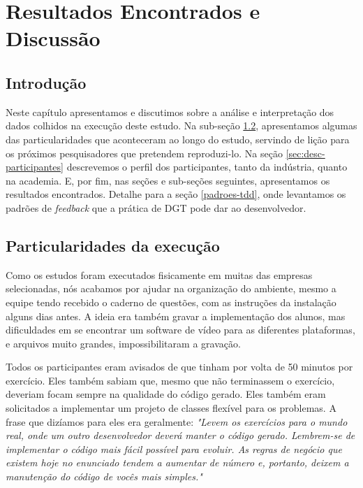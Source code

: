 \chapter{Resultados Encontrados e Discussão}
\label{cap:discussao}

\section{Introdução}

Neste capítulo apresentamos e discutimos sobre a análise e interpretação dos dados colhidos
na execução deste estudo. Na sub-seção \ref{subsec:particularidades-execucao}, apresentamos
algumas das particularidades que aconteceram ao longo do estudo, servindo de lição 
para os próximos pesquisadores que pretendem reproduzi-lo. Na seção \ref{sec:desc-participantes}
descrevemos o perfil dos participantes, tanto da indústria, quanto na academia. E, por fim, nas seções
e sub-seções seguintes, apresentamos os resultados encontrados. Detalhe para a seção 
\ref{padroes-tdd}, onde levantamos os padrões de \textit{feedback} que a prática de DGT
pode dar ao desenvolvedor.

\section{Particularidades da execução}
\label{subsec:particularidades-execucao}
Como os estudos foram executados fisicamente em muitas das empresas selecionadas,
nós acabamos por ajudar na organização do ambiente, mesmo a equipe tendo 
recebido o caderno de questões, com as instruções da instalação
alguns dias antes. A ideia era também gravar a implementação dos alunos,
mas dificuldades em se encontrar um software de vídeo para as diferentes
plataformas, e arquivos muito grandes, impossibilitaram a gravação.

Todos os participantes eram avisados de que tinham por volta de 50 minutos
por exercício. Eles também sabiam que, mesmo que não terminassem o exercício,
deveriam focam sempre na qualidade do código gerado. Eles também eram solicitados
a implementar um projeto de classes flexível para os problemas. A frase que dizíamos para
eles era geralmente: \textit{"Levem os exercícios para o mundo real, onde um outro
desenvolvedor deverá manter o código gerado. Lembrem-se de implementar o código mais fácil possível
para evoluir. As regras de negócio que existem hoje no enunciado tendem a aumentar
de número e, portanto, deixem a manutenção do código de vocês mais simples."}

